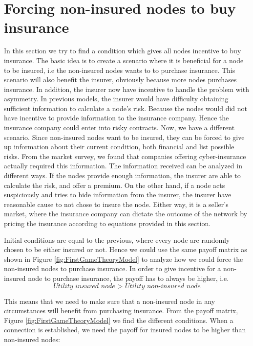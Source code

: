 \section{Forcing non-insured nodes to buy insurance}

In this section we try to find a condition which gives all nodes incentive to buy insurance. The basic idea is to create a scenario where it is beneficial for a node to be insured, i.e the non-insured nodes wants to to purchase insurance. 
This scenario will also benefit the insurer, obviously because more nodes purchases insurance. In addition, the insurer now have incentive to handle the problem with asymmetry. In previous models, the insurer would have difficulty obtaining sufficient information to calculate a node's risk. Because the nodes would did not have incentive to provide information to the insurance company. Hence the insurance company could enter into risky contracts. Now, we have a different scenario. Since non-insured nodes want to be insured, they can be forced to give up information about their current condition, both financial and list possible risks. From the market survey, we found that companies offering cyber-insurance actually required this information. The information received can be analyzed in different ways. If the nodes provide enough information, the insurer are able to calculate the risk, and offer a premium. On the other hand, if a node acts suspiciously and tries to hide information from the insurer, the insurer have reasonable cause to not chose to insure the node. Either way, it is a seller's market, where the insurance company can dictate the outcome of the network by pricing the insurance according to equations provided in this section.  

Initial conditions are equal to the previous, where every node are randomly chosen to be either insured or not. Hence we could use the same payoff matrix as shown in Figure \ref{fig:FirstGameTheoryModel} to analyze how we could force the non-insured nodes to purchase insurance. In order to give incentive for a non-insured node to purchase insurance, the payoff has to always be higher, i.e. 
\begin{equation}
\textit{Utility insured node > Utility non-insured node}
\end{equation}



This means that we need to make sure that a non-insured node in any circumstances will benefit from purchasing insurance. From the payoff matrix, Figure \ref{fig:FirstGameTheoryModel} we find the different conditions. When a connection is established, we need the payoff for insured nodes to be higher than non-insured nodes: 


